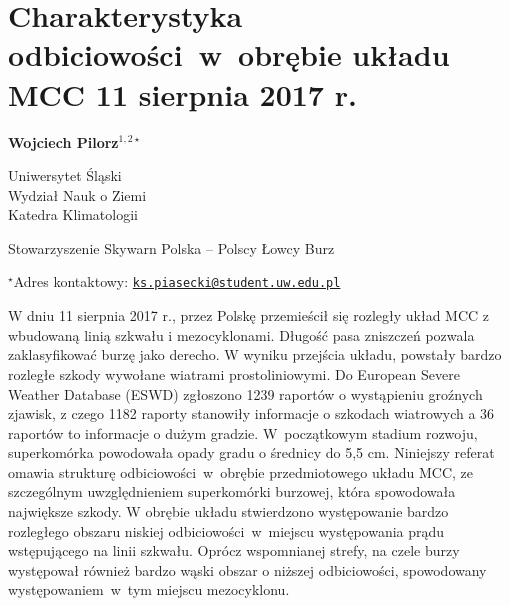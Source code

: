 \documentclass[\main/boa.tex]{subfiles}
\begin{document}
\section{Charakterystyka odbiciowości~w~obrębie układu MCC 11 sierpnia 2017 r.}

\begin{center}
  {\bf {} Wojciech Pilorz$^{1,2\star}$}
\end{center}

\vskip 0.3cm

\begin{affiliations}
\begin{enumerate}
\begin{minipage}{0.915\textwidth}
\centering
\item Uniwersytet Śląski\\Wydział Nauk o Ziemi\\ Katedra Klimatologii\\[-2pt]
\item Stowarzyszenie Skywarn Polska – Polscy Łowcy Burz\\[-2pt]
\end{minipage}
\end{enumerate}
$^\star$Adres kontaktowy: \href{mailto:ks.piasecki@student.uw.edu.pl}{\nolinkurl{ks.piasecki@student.uw.edu.pl}}\\
\end{affiliations}

\vskip 0.5cm


\vskip 0.5cm

W dniu 11 sierpnia 2017 r., przez Polskę przemieścił się rozległy układ MCC z wbudowaną linią szkwału i mezocyklonami. Długość pasa zniszczeń pozwala zaklasyfikować burzę jako derecho. W wyniku przejścia układu, powstały bardzo rozległe szkody wywołane wiatrami prostoliniowymi. Do European Severe Weather Database (ESWD) zgłoszono 1239 raportów o wystąpieniu groźnych zjawisk, z czego 1182 raporty stanowiły informacje o szkodach wiatrowych a 36 raportów to informacje o dużym gradzie. W~początkowym stadium rozwoju, superkomórka powodowała opady gradu o średnicy do 5,5 cm. Niniejszy referat omawia strukturę odbiciowości~w~obrębie przedmiotowego układu MCC, ze szczególnym uwzględnieniem superkomórki burzowej, która spowodowała największe szkody. W obrębie układu stwierdzono występowanie bardzo rozległego obszaru niskiej odbiciowości~w~miejscu występowania prądu wstępującego na linii szkwału. Oprócz wspomnianej strefy, na czele burzy występował również bardzo wąski obszar o niższej odbiciowości, spowodowany występowaniem~w~tym miejscu mezocyklonu.
\end{document}
